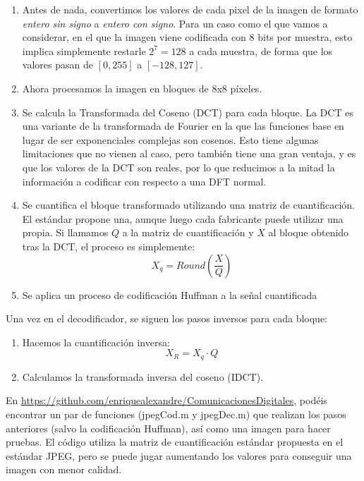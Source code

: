 \documentclass[es,practica]{uah}
\begin{document}
\begin{enumerate}
\item Antes de nada, convertimos los valores de cada pixel de la imagen de formato \emph{entero sin signo} a \emph{entero con signo}. Para un caso como el que vamos a considerar, en el que la imagen viene codificada con 8 bits por muestra, esto implica simplemente restarle $2^7 = 128$ a cada muestra, de forma que los valores pasan de $[0, 255]$ a $[-128, 127]$.
\item Ahora procesamos la imagen en bloques de 8x8 píxeles.
\item Se calcula la Transformada del Coseno (DCT) para cada bloque. La DCT es una variante de la transformada de Fourier en la que las funciones base en lugar de ser exponenciales complejas son cosenos. Esto tiene algunas limitaciones que no vienen al caso, pero también tiene una gran ventaja, y es que los valores de la DCT son reales, por lo que reducimos a la mitad la información a codificar con respecto a una DFT normal.
\item Se cuantifica el bloque transformado utilizando una matriz de cuantificación. El estándar propone una, aunque luego cada fabricante puede utilizar una propia. Si llamamos $Q$ a la matriz de cuantificación y $X$ al bloque obtenido tras la DCT, el proceso es simplemente:
\begin{equation}
	X_q = Round \left ( \frac{X}{Q} \right )
\end{equation}
\item Se aplica un proceso de codificación Huffman a la señal cuantificada
\end{enumerate}

Una vez en el decodificador, se siguen los pasos inversos para cada bloque:

\begin{enumerate}
\item Hacemos la cuantificación inversa:
\begin{equation}
	X_R = X_q \cdot Q
\end{equation}
\item Calculamos la transformada inversa del coseno (IDCT).
\end{enumerate}

En \url{https://github.com/enriquealexandre/ComunicacionesDigitales}, podéis encontrar un par de funciones (jpegCod.m y jpegDec.m) que realizan los pasos anteriores (salvo la codificación Huffman), así como una imagen para hacer pruebas. El código utiliza la matriz de cuantificación estándar propuesta en el estándar JPEG, pero se puede jugar aumentando los valores para conseguir una imagen con menor calidad. 
\end{document}
